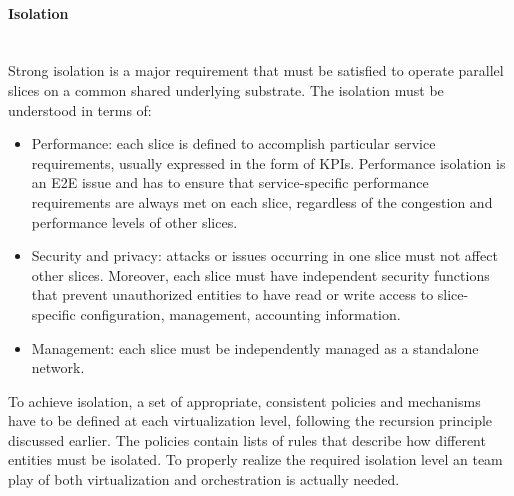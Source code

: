 \documentclass[a4paper,12pt]{report} %
\begin{document}
\paragraph{Isolation}\mbox{}\\
Strong isolation is a major requirement that must
be satisfied to operate parallel slices on a common shared underlying substrate. The isolation
must be understood in terms of:
\begin{itemize}
\item Performance: each slice is defined to accomplish particular service requirements, usually expressed in the
form of \gls{KPI}s. Performance isolation is an E2E issue and has to ensure
that service-specific performance requirements are
always met on each slice, regardless of the congestion and performance levels of other slices.
\end{itemize}
\begin{itemize}
\item Security and privacy: attacks or issues occurring in one slice must not affect
other slices. Moreover, each slice must have
independent security functions that prevent unauthorized entities to have read or write access to
slice-specific configuration, management, accounting information.
\end{itemize}
\begin{itemize}
\item Management: each slice must be independently managed as a standalone network.
\end{itemize}
To achieve isolation, a set of appropriate, consistent policies and mechanisms have to be defined
at each virtualization level, following the recursion
principle discussed earlier. The policies contain lists of rules that describe how different entities must be isolated.
To properly realize the required isolation level an team play of both virtualization and orchestration is actually needed.
\end{document}
